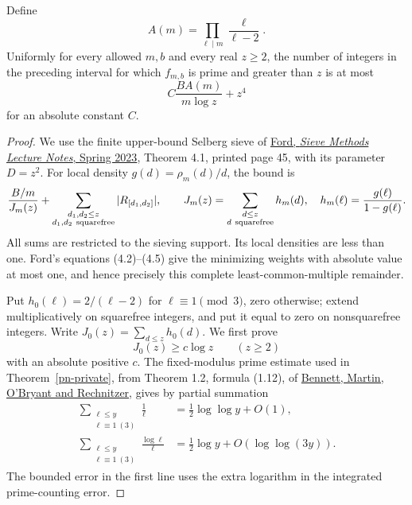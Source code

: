 \begin{lemma}\label{pdg-sieve}
Define
\[
 A(m)=\prod_{\ell\mid m}\frac{\ell}{\ell-2}.
\]
Uniformly for every allowed \(m,b\) and every real \(z\geq2\), the
number of integers in the preceding interval for which \(f_{m,b}\)
is prime and greater than \(z\) is at most
\begin{equation}\label{pdg-sieve-bound}
 C\frac{B A(m)}{m\log z}+z^4
\end{equation}
for an absolute constant \(C\).
\end{lemma}
\begin{proof}
We use the finite upper-bound Selberg sieve of
\href{https://ford126.web.illinois.edu/sieve2023.pdf}
{Ford, \emph{Sieve Methods Lecture Notes}, Spring 2023},
Theorem 4.1, printed page 45, with its parameter \(D=z^2\).
For local density \(g(d)=\rho_m(d)/d\), the bound is
\[
 \frac{B/m}{J_m(z)}
       +\sum_{\substack{d_1,d_2\leq z\\d_1,d_2\ {\rm squarefree}}}
                 |R_{[d_1,d_2]}|,
 \qquad
 J_m(z)=\sum_{\substack{d\leq z\\d\ {\rm squarefree}}}h_m(d),
 \quad h_m(\ell)=\frac{g(\ell)}{1-g(\ell)}.
\]
All sums are restricted to the sieving support. Its local densities
are less than one. Ford's equations (4.2)--(4.5) give the minimizing
weights with absolute value at most one, and hence precisely this
complete least-common-multiple remainder.

Put \(h_0(\ell)=2/(\ell-2)\) for \(\ell\equiv1\pmod3\), zero
otherwise; extend multiplicatively on squarefree integers, and put
it equal to zero on nonsquarefree integers. Write
\(J_0(z)=\sum_{d\leq z}h_0(d)\). We first prove
\begin{equation}\label{pdg-jzero}
 J_0(z)\geq c\log z\qquad(z\geq2)
\end{equation}
with an absolute positive \(c\). The fixed-modulus prime estimate
used in Theorem~\ref{pn-private}, from Theorem 1.2, formula (1.12),
of \href{https://arxiv.org/abs/1802.00085v3}
{Bennett, Martin, O'Bryant and Rechnitzer}, gives by partial summation
\begin{align*}
 \sum_{\substack{\ell\leq y\\\ell\equiv1\ (3)}}\frac1\ell
   &=\frac12\log\log y+O(1),\\
 \sum_{\substack{\ell\leq y\\\ell\equiv1\ (3)}}\frac{\log\ell}{\ell}
   &=\frac12\log y+O(\log\log(3y)).
\end{align*}
The bounded error in the first line uses the extra logarithm in
the integrated prime-counting error.


\end{proof}

